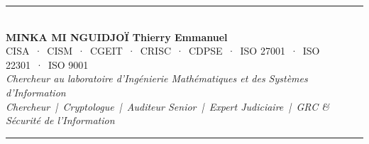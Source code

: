 \documentclass[12pt, twoside, openright, a4paper]{book}
\begin{document}
\begin{center}
    {\color{CouleurAccent}\rule{0.7\linewidth}{1.2pt}}\\[1.2ex]
    {\color{white}\large\bfseries MINKA MI NGUIDJOÏ Thierry Emmanuel}\\[0.4ex]
    {\color{white!80!gray}\small
        CISA~·~CISM~·~CGEIT~·~CRISC~·~CDPSE~·~ISO 27001~·~ISO 22301~·~ISO 9001}\\[0.3ex]
    {\color{white!70!gray}\footnotesize\itshape
        Chercheur au laboratoire d'Ingénierie Mathématiques et des Systèmes d'Information}\\[0.3ex]
    {\color{white!70!gray}\footnotesize\itshape
        Chercheur~|~Cryptologue~|~Auditeur Senior~|~Expert Judiciaire~|~GRC \& Sécurité de l'Information}\\[1.2ex]
    {\color{CouleurAccent}\rule{0.7\linewidth}{1.2pt}}
\end{center}

\vspace{1cm}

\afterpage{\nopagecolor}
\end{document}
